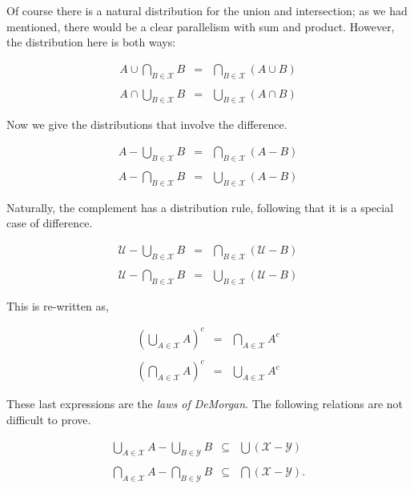 \documentclass [12pt]{book}
\begin{document}
Of course there is a natural distribution for the union and intersection; as we had mentioned, there would be a clear parallelism with sum and product. However, the distribution here is both ways:

\begin{eqnarray} A\cup\bigcap_{B\in\mathcal{X}}B&=&\bigcap_{B\in\mathcal{X}}(A\cup B)\\\nonumber\\\nonumber A\cap\bigcup_{B\in\mathcal{X}}B&=&\bigcup_{B\in\mathcal{X}}(A\cap B)\end{eqnarray}

Now we give the distributions that involve the difference.

\begin{eqnarray} A-\bigcup_{B\in\mathcal{X}}B&=&\bigcap_{B\in\mathcal{X}}(A-B)
\\\nonumber\\\nonumber A-\bigcap_{B\in\mathcal{X}}B&=&\bigcup_{B\in\mathcal{X}}(A-B)
\end{eqnarray}

Naturally, the complement has a distribution rule, following that it is a special case of difference.

\begin{eqnarray}\nonumber\mathcal{U}-\bigcup_{B\in\mathcal{X}}B&=&\bigcap_{B\in\mathcal{X}}(\mathcal{U}-B)
\\\nonumber\\\nonumber \mathcal{U}-\bigcap_{B\in\mathcal{X}}B&=&\bigcup_{B\in\mathcal{X}}(\mathcal{U}-B)\end{eqnarray}

This is re-written as,

\begin{eqnarray} \left(\bigcup_{A\in\mathcal{X}}A\right)^c&=&\bigcap_{A\in\mathcal{X}}A^c
\\\nonumber\\ \left(\bigcap_{A\in\mathcal{X}}A\right)^c&=&\bigcup_{A\in\mathcal{X}}A^c\end{eqnarray}

These last expressions are the \textit{laws of DeMorgan}. The following relations are not difficult to prove.

\begin{eqnarray}\nonumber\bigcup_{A\in\mathcal{X}}A-\bigcup_{B\in\mathcal{Y}}B
&\subseteq&\bigcup(\mathcal{X}-
\mathcal{Y})\\\nonumber\\\nonumber\bigcap_{A\in\mathcal{X}}A-\bigcap_
{B\in\mathcal{Y}}B&\subseteq&\bigcap(\mathcal{X}-
\mathcal{Y}).\end{eqnarray}
\end{document}
